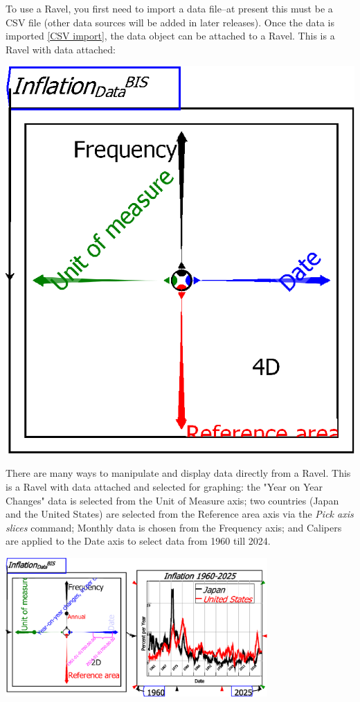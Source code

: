 To use a Ravel, you first need to import a data file--at present
this must be a CSV file (other data sources will be added in later
releases). Once the data is imported \ref{CSV import}, the data object
can be attached to a Ravel. This is a Ravel with data attached:
\begin{flushleft}
\includegraphics{images/01RavelDataInflation} 
\par\end{flushleft}

There are many ways to manipulate and display data directly from a
Ravel. This is a Ravel with data attached and selected for graphing:
the "Year on Year Changes" data is selected from the Unit of Measure
axis; two countries (Japan and the United States) are selected from
the Reference area axis via the \emph{Pick axis slices} command; Monthly
data is chosen from the Frequency axis; and Calipers are applied to
the Date axis to select data from 1960 till 2024.

\includegraphics[width=10cm]{images/01BRavelDataInflationSelected}

